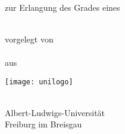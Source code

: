 %
%
%

\begin{titlepage}
\setcounter{page}{-1}
\centering
\begin{Large}
\bfseries\Titel\par
\end{Large}

\vspace*{\fill}

\begin{large}
\textbf{\Typ}\\
zur Erlangung des Grades eines\\
\Grad\ \Fach\par
\end{large}

\vspace*{\fill}

\begin{large}
vorgelegt von\\
\textbf{\Name}\\
aus \Geburtsort\par
\end{large}

\vspace*{\fill}

\texttt{[image: unilogo]}

\vspace*{\fill}

\begin{large}
\Fakultaet\\
Albert-Ludwigs-Universität\\
Freiburg im Breisgau\\
\Jahr\par
\end{large}
\end{titlepage}

